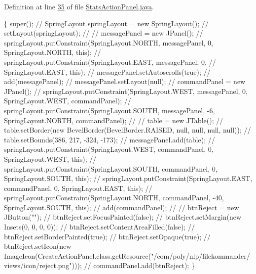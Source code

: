 Definition at line \hyperlink{L35}{35} of file \hyperlink{}{Stats\-Action\-Panel.\-java}.


\begin{DoxyCode}
                              \{
        super();
\textcolor{comment}{//      SpringLayout springLayout = new SpringLayout();}
\textcolor{comment}{//      setLayout(springLayout);}
\textcolor{comment}{//}
\textcolor{comment}{//      messagePanel = new JPanel();}
\textcolor{comment}{//      springLayout.putConstraint(SpringLayout.NORTH, messagePanel, 0,
       SpringLayout.NORTH, this);}
\textcolor{comment}{//      springLayout.putConstraint(SpringLayout.EAST, messagePanel, 0,}
\textcolor{comment}{//              SpringLayout.EAST, this);}
\textcolor{comment}{//      messagePanel.setAutoscrolls(true);}
\textcolor{comment}{//      add(messagePanel);}
\textcolor{comment}{//      messagePanel.setLayout(null);}
\textcolor{comment}{//          commandPanel = new JPanel();}
\textcolor{comment}{//          springLayout.putConstraint(SpringLayout.WEST, messagePanel, 0,
       SpringLayout.WEST, commandPanel);}
\textcolor{comment}{//          springLayout.putConstraint(SpringLayout.SOUTH, messagePanel, -6,
       SpringLayout.NORTH, commandPanel);}
\textcolor{comment}{//              }
\textcolor{comment}{//              table = new JTable();}
\textcolor{comment}{//              table.setBorder(new BevelBorder(BevelBorder.RAISED, null, null,
       null, null));}
\textcolor{comment}{//              table.setBounds(386, 217, -324, -173);}
\textcolor{comment}{//              messagePanel.add(table);}
\textcolor{comment}{//              springLayout.putConstraint(SpringLayout.WEST, commandPanel, 0,
       SpringLayout.WEST, this);}
\textcolor{comment}{//              springLayout.putConstraint(SpringLayout.SOUTH, commandPanel, 0,
       SpringLayout.SOUTH, this);}
\textcolor{comment}{//              springLayout.putConstraint(SpringLayout.EAST, commandPanel, 0,
       SpringLayout.EAST, this);}
\textcolor{comment}{//              springLayout.putConstraint(SpringLayout.NORTH, commandPanel,
       -40, SpringLayout.SOUTH, this);}
\textcolor{comment}{//              add(commandPanel);}
\textcolor{comment}{//              }
\textcolor{comment}{//              btnReject = new JButton("");}
\textcolor{comment}{//              btnReject.setFocusPainted(false);}
\textcolor{comment}{//              btnReject.setMargin(new Insets(0, 0, 0, 0));}
\textcolor{comment}{//              btnReject.setContentAreaFilled(false);}
\textcolor{comment}{//              btnReject.setBorderPainted(true);}
\textcolor{comment}{//              btnReject.setOpaque(true);}
\textcolor{comment}{//              btnReject.setIcon(new
       ImageIcon(CreateActionPanel.class.getResource("/com/poly/nlp/filekommander/views/icon/reject.png")));}
\textcolor{comment}{//              commandPanel.add(btnReject);}
    \}
\end{DoxyCode}


